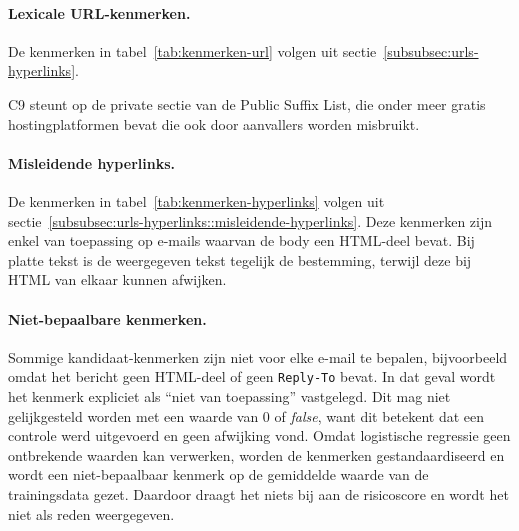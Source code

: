 \paragraph{Lexicale URL-kenmerken.}
De kenmerken in tabel~\ref{tab:kenmerken-url} volgen uit sectie~\ref{subsubsec:urls-hyperlinks}.



C9 steunt op de private sectie van de Public Suffix List, die onder meer gratis hostingplatformen bevat die ook door aanvallers worden misbruikt.

\paragraph{Misleidende hyperlinks.}
De kenmerken in tabel~\ref{tab:kenmerken-hyperlinks} volgen uit sectie~\ref{subsubsec:urls-hyperlinks::misleidende-hyperlinks}.
Deze kenmerken zijn enkel van toepassing op e-mails waarvan de body een HTML-deel bevat. Bij platte tekst is de weergegeven tekst tegelijk de bestemming, terwijl deze bij HTML van elkaar kunnen afwijken. 



\paragraph{Niet-bepaalbare kenmerken.}
Sommige kan\-di\-daat-kenmerken zijn niet voor elke e-mail te bepalen, bijvoorbeeld omdat het bericht geen HTML-deel of geen \texttt{Reply-To} bevat. In dat geval wordt het kenmerk expliciet als ``niet van toepassing'' vastgelegd. Dit mag niet gelijkgesteld worden met een waarde van 0 of \emph{false}, want dit betekent dat een controle werd uitgevoerd en geen afwijking vond. Omdat logistische regressie geen ontbrekende waarden kan verwerken, worden de kenmerken gestandaardiseerd en wordt een niet-bepaalbaar kenmerk op de gemiddelde waarde van de trainingsdata gezet. Daardoor draagt het niets bij aan de risicoscore en wordt het niet als reden weergegeven.